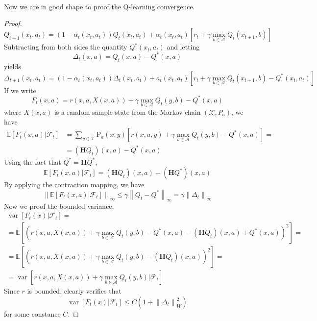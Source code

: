 \documentclass[a4paper]{article}
\theoremstyle{definition}
\begin{document}
Now we are in good shape to proof the Q-learning convergence.
\begin{proof}
$$
Q_{t+1}\left(x_{t}, a_{t}\right)=\left(1-\alpha_{t}\left(x_{t}, a_{t}\right)\right) Q_{t}\left(x_{t}, a_{t}\right)+\alpha_{t}\left(x_{t}, a_{t}\right)\left[r_{t}+\gamma \max _{b \in \mathcal{A}} Q_{t}\left(x_{t+1}, b\right)\right]
$$
Subtracting from both sides the quantity \(Q^{*}\left(x_{t}, a_{t}\right)\) and letting
$$
\Delta_{t}(x, a)=Q_{t}(x, a)-Q^{*}(x, a)
$$
yields
$$
\Delta_{t+1}(x_t, a_t) = \left(1-\alpha_{t}\left(x_{t}, a_{t}\right)\right)\Delta_{t}(x_t, a_t) + a_t(x_t, a_t)\left[r_{t}+\gamma \max _{b \in \mathcal{A}} Q_{t}\left(x_{t+1}, b\right)-Q^{*}\left(x_{t}, a_{t}\right)\right]
$$
If we write
$$
F_{t}(x, a)=r(x, a, X(x, a))+\gamma \max _{b \in \mathcal{A}} Q_{t}(y, b)-Q^{*}(x, a)
$$
where $X(x, a)$ is a random sample state from the Markov chain $(\mathcal{X}, P_a)$,
we have
\begin{align*} \mathbb{E}\left[F_{t}(x, a) | \mathcal{F}_{t}\right] &=\sum_{y \in \mathcal{X}} \mathrm{P}_{a}(x, y)\left[r(x, a, y)+\gamma \max _{b \in \mathcal{A}} Q_{t}(y, b)-Q^{*}(x, a)\right]=\\ &=\left(\mathbf{H} Q_{t}\right)(x, a)-Q^{*}(x, a) \end{align*}
Using the fact that $Q^{*} = \mathbf{H}Q^{*}$,
\begin{equation}
\mathbb{E}\left[F_{t}(x, a) | \mathcal{F}_{t}\right]=\left(\mathbf{H} Q_{t}\right)(x, a)-\left(\mathbf{H} Q^{*}\right)(x, a)
\end{equation}
By applying the contraction mapping, we have
\begin{equation}
\left\|\mathbb{E}\left[F_{t}(x, a) | \mathcal{F}_{t}\right]\right\|_{\infty} \leq \gamma\left\|Q_{t}-Q^{*}\right\|_{\infty}=\gamma\left\|\Delta_{t}\right\|_{\infty}
\end{equation}
Now we proof the bounded variance:
\begin{equation}
\begin{array}{l}{\operatorname{var}\left[F_{t}(x) | \mathcal{F}_{t}\right]=} \\ {=\mathbb{E}\left[\left(r(x, a, X(x, a))+\gamma \max _{b \in \mathcal{A}} Q_{t}(y, b)-Q^{*}(x, a)-\left(\mathbf{H} Q_{t}\right)(x, a)+Q^{*}(x, a)\right)^{2}\right]=} \\ {=\mathbb{E}\left[\left(r(x, a, X(x, a))+\gamma \max _{b \in \mathcal{A}} Q_{t}(y, b)-\left(\mathbf{H} Q_{t}\right)(x, a)\right)^{2}\right]=} \\ {=\operatorname{var}\left[r(x, a, X(x, a))+\gamma \max _{b \in \mathcal{A}} Q_{t}(y, b) | \mathcal{F}_{t}\right]}\end{array}
\end{equation}
Since $r$ is bounded, clearly verifies that 
\begin{equation}
\operatorname{var}\left[F_{t}(x) | \mathcal{F}_{t}\right] \leq C\left(1+\left\|\Delta_{t}\right\|_{W}^{2}\right)
\end{equation}
for some constance $C$.
\end{proof}
\end{document}
